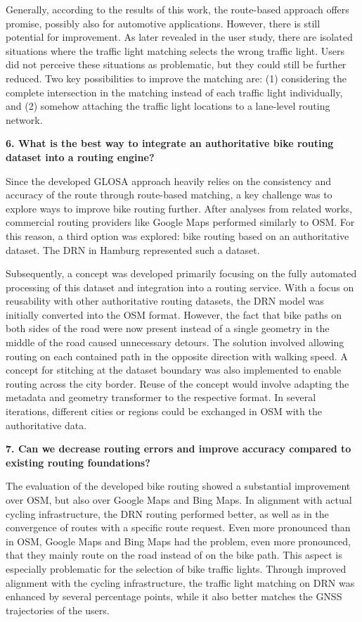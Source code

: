 Generally, according to the results of this work, the route-based approach offers promise, possibly also for automotive applications. However, there is still potential for improvement. As later revealed in the user study, there are isolated situations where the traffic light matching selects the wrong traffic light. Users did not perceive these situations as problematic, but they could still be further reduced. Two key possibilities to improve the matching are: (1) considering the complete intersection in the matching instead of each traffic light individually, and (2) somehow attaching the traffic light locations to a lane-level routing network. 

\textbf{\color{cidarkblue}6. What is the best way to integrate an authoritative bike routing dataset into a routing engine?}

Since the developed GLOSA approach heavily relies on the consistency and accuracy of the route through route-based matching, a key challenge was to explore ways to improve bike routing further. After analyses from related works, commercial routing providers like Google Maps performed similarly to OSM. For this reason, a third option was explored: bike routing based on an authoritative dataset. The DRN in Hamburg represented such a dataset. 

Subsequently, a concept was developed primarily focusing on the fully automated processing of this dataset and integration into a routing service. With a focus on reusability with other authoritative routing datasets, the DRN model was initially converted into the OSM format. However, the fact that bike paths on both sides of the road were now present instead of a single geometry in the middle of the road caused unnecessary detours. The solution involved allowing routing on each contained path in the opposite direction with walking speed. A concept for stitching at the dataset boundary was also implemented to enable routing across the city border. Reuse of the concept would involve adapting the metadata and geometry transformer to the respective format. In several iterations, different cities or regions could be exchanged in OSM with the authoritative data.

\textbf{\color{cidarkblue}7. Can we decrease routing errors and improve accuracy compared to existing routing foundations?}

The evaluation of the developed bike routing showed a substantial improvement over OSM, but also over Google Maps and Bing Maps. In alignment with actual cycling infrastructure, the DRN routing performed better, as well as in the convergence of routes with a specific route request. Even more pronounced than in OSM, Google Maps and Bing Maps had the problem, even more pronounced, that they mainly route on the road instead of on the bike path. This aspect is especially problematic for the selection of bike traffic lights. Through improved alignment with the cycling infrastructure, the traffic light matching on DRN was enhanced by several percentage points, while it also better matches the GNSS trajectories of the users. 


